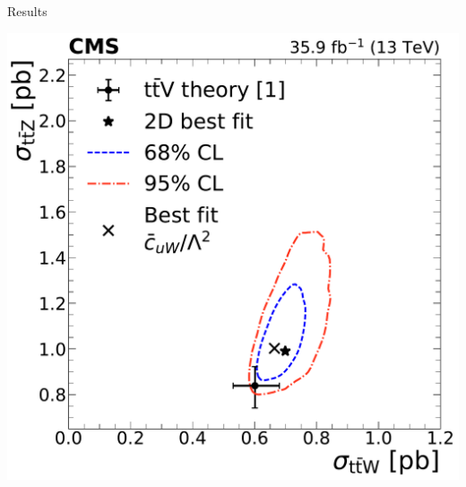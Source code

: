 \documentclass[professionalfont,fleqn]{beamer}
\begin{document}
\begin{frame}{Results}
\begin{overlayarea}{\textwidth}{7cm}
{    \includegraphics[height=\textheight]{figures/thirteen-TeV/NP/2D/ttZ_ttW_2D_1D_cuW}
  }
\end{overlayarea}
\end{frame}
\end{document}
